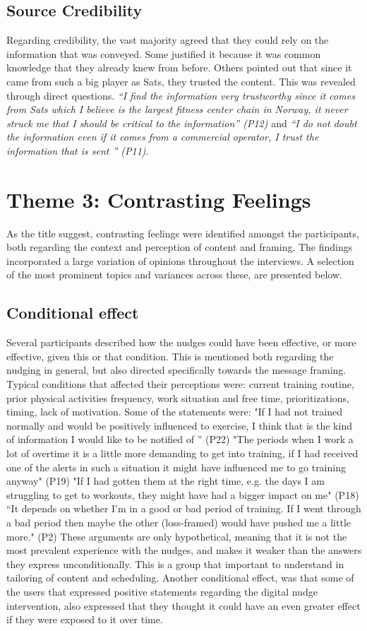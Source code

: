 \subsection{Source Credibility}
Regarding credibility, the vast majority agreed that they could rely on the information that was conveyed. Some justified it because it was common knowledge that they already knew from before. Others pointed out that since it came from such a big player as Sats, they trusted the content. This was revealed through direct questions. \textit{“I find the information very trustworthy since it comes from Sats which I believe is the largest fitness center chain in Norway, it never struck me that I should be critical to the information” (P12)} and \textit{“I do not doubt the information even if it comes from a commercial operator, I trust the information that is sent ” (P11)}.

\section{Theme 3: Contrasting Feelings}
As the title suggest, contrasting feelings were identified amongst the participants, both regarding the context and perception of content and framing. The findings incorporated a large variation of opinions throughout the interviews. A selection of the most prominent topics and variances across these, are presented below. 

\subsection{Conditional effect}
Several participants described how the nudges could have been effective, or more effective, given this or that condition. This is mentioned both regarding the nudging in general, but also directed specifically towards the message framing. Typical conditions that affected their perceptions were: current training routine, prior physical activities frequency, work situation and free time, prioritizations, timing, lack of motivation. Some of the statements were: 
"If I had not trained normally and would be positively influenced to exercise, I think that is the kind of information I would like to be notified of ” (P22)
"The periods when I work a lot of overtime it is a little more demanding to get into training, if I had received one of the alerts in such a situation it might have influenced me to go  training anyway" (P19)
"If I had gotten them at the right time, e.g. the days I am struggling to get to workouts, they might have had a bigger impact on me" (P18)
“It depends on whether I'm in a good or bad period of training. If I went through a bad period then maybe the other (loss-framed) would have pushed me a little more." (P2)
These arguments are only hypothetical, meaning that it is not the most prevalent experience with the nudges, and makes it weaker than the answers they express unconditionally. This is a group that important to understand in tailoring of content and scheduling. Another conditional effect, was that some of the users that expressed positive statements regarding the digital nudge intervention, also expressed that they thought it could have an even greater effect if they were exposed to it over time.

